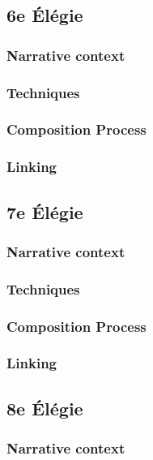 \documentclass[12pt,twoside,maitrise]{dms}
\theoremstyle{definition}
\begin{document}
\subsection{6e Élégie}

\subsubsection{Narrative context}

\subsubsection{Techniques}

\subsubsection{Composition Process}

\subsubsection{Linking}

\subsection{7e Élégie}

\subsubsection{Narrative context}

\subsubsection{Techniques}

\subsubsection{Composition Process}

\subsubsection{Linking}

\subsection{8e Élégie}

\subsubsection{Narrative context}
\end{document}
